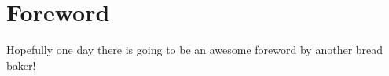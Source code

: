 \chapter{Foreword}%
\label{ch:Foreword}
Hopefully one day there is going to be an awesome foreword
by another bread baker!
